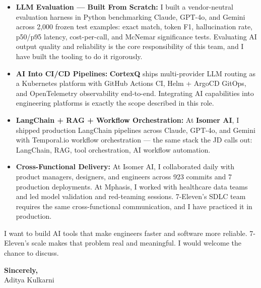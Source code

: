 \documentclass[11pt,letterpaper]{article}
\begin{document}
\begin{itemize}[leftmargin=*, itemsep=3pt, label={\color{SevenGreen}\faAngleRight}]
    \item \textbf{LLM Evaluation — Built From Scratch:} I built a vendor-neutral evaluation harness in Python benchmarking Claude, GPT-4o, and Gemini across 2,000 frozen test examples: exact match, token F1, hallucination rate, p50/p95 latency, cost-per-call, and McNemar significance tests. Evaluating AI output quality and reliability is the core responsibility of this team, and I have built the tooling to do it rigorously.

    \item \textbf{AI Into CI/CD Pipelines:} \textbf{CortexQ} ships multi-provider LLM routing as a Kubernetes platform with GitHub Actions CI, Helm + ArgoCD GitOps, and OpenTelemetry observability end-to-end. Integrating AI capabilities into engineering platforms is exactly the scope described in this role.

    \item \textbf{LangChain + RAG + Workflow Orchestration:} At \textbf{Isomer AI}, I shipped production LangChain pipelines across Claude, GPT-4o, and Gemini with Temporal.io workflow orchestration --- the same stack the JD calls out: LangChain, RAG, tool orchestration, AI workflow automation.

    \item \textbf{Cross-Functional Delivery:} At Isomer AI, I collaborated daily with product managers, designers, and engineers across 923 commits and 7 production deployments. At Mphasis, I worked with healthcare data teams and led model validation and red-teaming sessions. 7-Eleven's SDLC team requires the same cross-functional communication, and I have practiced it in production.
\end{itemize}

\vspace{6pt}

I want to build AI tools that make engineers faster and software more reliable. 7-Eleven's scale makes that problem real and meaningful. I would welcome the chance to discuss.

\vspace{12pt}

\textbf{Sincerely,}\\[8pt]
Aditya Kulkarni
\end{document}
